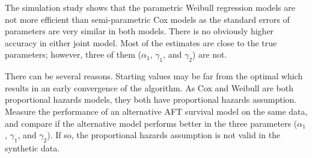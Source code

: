 The simulation study shows that the parametric Weibull regression models are not more efficient than semi-parametric Cox models as the standard errors of parameters are very similar in both models. There is no obviously higher accuracy in either joint model. Most of the estimates are close to the true parameters; however, three of them ($\alpha_1$, $\gamma_1$, and $\gamma_2$) are not. 

There can be several reasons. Starting values may be far from the optimal which results in an early convergence of the algorithm. As Cox and Weibull are both proportional hazards models, they both have proportional hazards assumption.
Measure the performance of an alternative AFT survival model on the same data, and compare if the alternative model performs better in the three parameters ($\alpha_1$, $\gamma_1$, and $\gamma_2$). If so, the proportional hazards assumption is not valid in the synthetic data.



